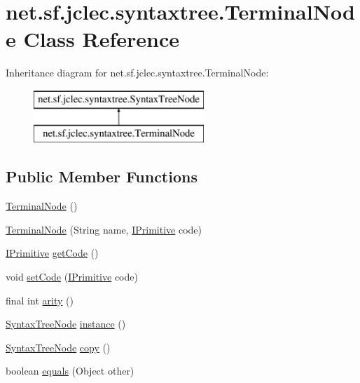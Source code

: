 \hypertarget{classnet_1_1sf_1_1jclec_1_1syntaxtree_1_1_terminal_node}{\section{net.\-sf.\-jclec.\-syntaxtree.\-Terminal\-Node Class Reference}
\label{classnet_1_1sf_1_1jclec_1_1syntaxtree_1_1_terminal_node}
}
Inheritance diagram for net.\-sf.\-jclec.\-syntaxtree.\-Terminal\-Node\-:\begin{figure}[H]
\begin{center}
\leavevmode
\includegraphics[height=2.000000cm]{classnet_1_1sf_1_1jclec_1_1syntaxtree_1_1_terminal_node}
\end{center}
\end{figure}
\subsection*{Public Member Functions}
\begin{DoxyCompactItemize}
\item 
\hyperlink{classnet_1_1sf_1_1jclec_1_1syntaxtree_1_1_terminal_node_a476075f97b89f33a2470b40d4a76a7cc}{Terminal\-Node} ()
\item 
\hyperlink{classnet_1_1sf_1_1jclec_1_1syntaxtree_1_1_terminal_node_aa08baebd648f99bc82fc83fcd46023a1}{Terminal\-Node} (String name, \hyperlink{interfacenet_1_1sf_1_1jclec_1_1exprtree_1_1_i_primitive}{I\-Primitive} code)
\item 
\hyperlink{interfacenet_1_1sf_1_1jclec_1_1exprtree_1_1_i_primitive}{I\-Primitive} \hyperlink{classnet_1_1sf_1_1jclec_1_1syntaxtree_1_1_terminal_node_a955059ee6a4335e560370748a709a1ed}{get\-Code} ()
\item 
void \hyperlink{classnet_1_1sf_1_1jclec_1_1syntaxtree_1_1_terminal_node_ae8ae1be2d2588d631e9f39bd79018bfd}{set\-Code} (\hyperlink{interfacenet_1_1sf_1_1jclec_1_1exprtree_1_1_i_primitive}{I\-Primitive} code)
\item 
final int \hyperlink{classnet_1_1sf_1_1jclec_1_1syntaxtree_1_1_terminal_node_a02d17dd28f183a439305c65aface9887}{arity} ()
\item 
\hyperlink{classnet_1_1sf_1_1jclec_1_1syntaxtree_1_1_syntax_tree_node}{Syntax\-Tree\-Node} \hyperlink{classnet_1_1sf_1_1jclec_1_1syntaxtree_1_1_terminal_node_add34640f3d3a31dec37f5834b4b8df6a}{instance} ()
\item 
\hyperlink{classnet_1_1sf_1_1jclec_1_1syntaxtree_1_1_syntax_tree_node}{Syntax\-Tree\-Node} \hyperlink{classnet_1_1sf_1_1jclec_1_1syntaxtree_1_1_terminal_node_af0cfec77b7364c617f98f73c6c418efc}{copy} ()
\item 
boolean \hyperlink{classnet_1_1sf_1_1jclec_1_1syntaxtree_1_1_terminal_node_a9006a57c50c6bb1a5fd62875b32a37c1}{equals} (Object other)
\end{DoxyCompactItemize}
